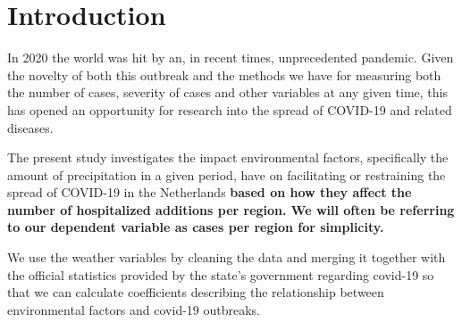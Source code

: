 \section{Introduction}
In 2020 the world was hit by an, in recent times, unprecedented pandemic. Given the novelty of both this outbreak and the methods we have for measuring both the number of cases, severity of cases and other variables at any given time, this has opened an opportunity for research into the spread of COVID-19 and related diseases. 

The present study investigates the impact environmental factors, specifically the amount of precipitation in a given period, have on facilitating or restraining the spread of COVID-19 in the Netherlands \textbf{based on how they affect the number of hospitalized additions per region. We will often be referring to our dependent variable as cases per region for simplicity.}

We use the weather variables by cleaning the data and merging it together with the official statistics provided by the state's government regarding covid-19 so that we can calculate coefficients describing the relationship between environmental factors and covid-19 outbreaks.
